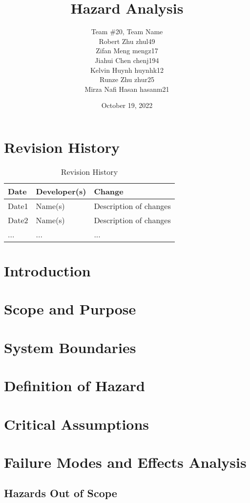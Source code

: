 \documentclass{article}
\title{Hazard Analysis\\\progname}
\author{\authname}
\author{Team \#20, Team Name
\\ Robert Zhu zhul49
\\ Zifan Meng mengz17
\\ Jiahui Chen chenj194
\\ Kelvin Huynh huynhk12
\\ Runze Zhu zhur25
\\ Mirza Nafi Hasan hasanm21
}
\date{October 19, 2022}
\begin{document}
\maketitle

\tableofcontents

\section*{Revision History}
\begin{table}[hp]
\caption{Revision History} \label{TblRevisionHistory}
\begin{tabularx}{\textwidth}{llX}
\toprule
\textbf{Date} & \textbf{Developer(s)} & \textbf{Change}\\
\midrule
Date1 & Name(s) & Description of changes\\
Date2 & Name(s) & Description of changes\\
... & ... & ...\\
\bottomrule
\end{tabularx}
\end{table}

\newpage

\section{Introduction}

\section{Scope and Purpose}

\section{System Boundaries}

\section{Definition of Hazard}

\section{Critical Assumptions}

\section{Failure Modes and Effects Analysis}

\subsection{Hazards Out of Scope}
\end{document}
